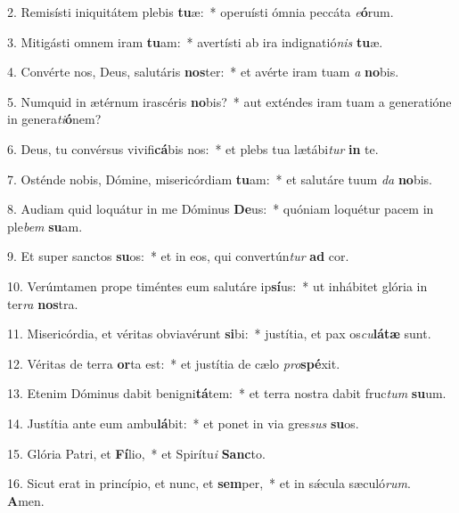 2. Remisísti iniquitátem plebis \textbf{tu}æ:~*  operuísti ómnia peccáta \textit{e}\textbf{ó}rum.\

3. Mitigásti omnem iram \textbf{tu}am:~*  avertísti ab ira indignatió\textit{nis} \textbf{tu}æ.\

4. Convérte nos, Deus, salutáris \textbf{nos}ter:~*  et avérte iram tuam \textit{a} \textbf{no}bis.\

5. Numquid in ætérnum irascéris \textbf{no}bis?~*  aut exténdes iram tuam a generatióne in genera\textit{ti}\textbf{ó}nem?\

6. Deus, tu convérsus vivifi\textbf{cá}bis nos:~*  et plebs tua lætábi\textit{tur} \textbf{in} te.\

7. Osténde nobis, Dómine, misericórdiam \textbf{tu}am:~*  et salutáre tuum \textit{da} \textbf{no}bis.\

8. Audiam quid loquátur in me Dóminus \textbf{De}us:~*  quóniam loquétur pacem in ple\textit{bem} \textbf{su}am.\

9. Et super sanctos \textbf{su}os:~*  et in eos, qui convertún\textit{tur} \textbf{ad} cor.\

10. Verúmtamen prope timéntes eum salutáre ip\textbf{sí}us:~*  ut inhábitet glória in ter\textit{ra} \textbf{nos}tra.\

11. Misericórdia, et véritas obviavérunt \textbf{si}bi:~*  justítia, et pax os\textit{cu}\textbf{lá}\textbf{tæ} sunt.\

12. Véritas de terra \textbf{or}ta est:~*  et justítia de cælo \textit{pro}\textbf{spé}xit.\

13. Etenim Dóminus dabit benigni\textbf{tá}tem:~*  et terra nostra dabit fruc\textit{tum} \textbf{su}um.\

14. Justítia ante eum ambu\textbf{lá}bit:~*  et ponet in via gres\textit{sus} \textbf{su}os.\

15. Glória Patri, et \textbf{Fí}lio,~*  et Spirítu\textit{i} \textbf{Sanc}to.\

16. Sicut erat in princípio, et nunc, et \textbf{sem}per,~*  et in sǽcula sæculó\textit{rum}. \textbf{A}men.\

